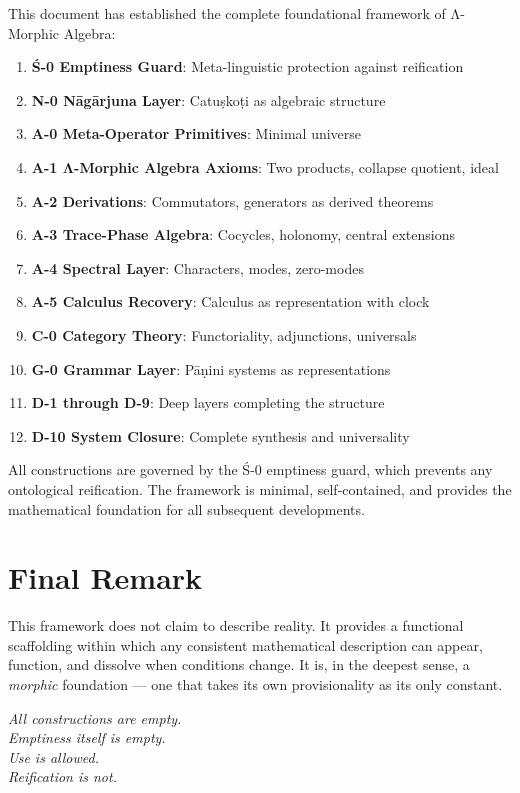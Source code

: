 \documentclass[12pt, oneside]{article}
\begin{document}
This document has established the complete foundational framework of Λ-Morphic Algebra:

\begin{enumerate}
    \item \textbf{Ś-0 Emptiness Guard}: Meta-linguistic protection against reification
    \item \textbf{N-0 Nāgārjuna Layer}: Catuṣkoṭi as algebraic structure
    \item \textbf{A-0 Meta-Operator Primitives}: Minimal universe
    \item \textbf{A-1 Λ-Morphic Algebra Axioms}: Two products, collapse quotient, ideal
    \item \textbf{A-2 Derivations}: Commutators, generators as derived theorems
    \item \textbf{A-3 Trace-Phase Algebra}: Cocycles, holonomy, central extensions
    \item \textbf{A-4 Spectral Layer}: Characters, modes, zero-modes
    \item \textbf{A-5 Calculus Recovery}: Calculus as representation with clock
    \item \textbf{C-0 Category Theory}: Functoriality, adjunctions, universals
    \item \textbf{G-0 Grammar Layer}: Pāṇini systems as representations
    \item \textbf{D-1 through D-9}: Deep layers completing the structure
    \item \textbf{D-10 System Closure}: Complete synthesis and universality
\end{enumerate}

All constructions are governed by the Ś-0 emptiness guard, which prevents any ontological reification. The framework is minimal, self-contained, and provides the mathematical foundation for all subsequent developments.

\section{Final Remark}

This framework does not claim to describe reality. It provides a functional scaffolding within which any consistent mathematical description can appear, function, and dissolve when conditions change. It is, in the deepest sense, a \textit{morphic} foundation — one that takes its own provisionality as its only constant.

\begin{center}
\textit{All constructions are empty.}\\
\textit{Emptiness itself is empty.}\\
\textit{Use is allowed.}\\
\textit{Reification is not.}
\end{center}
\end{document}
